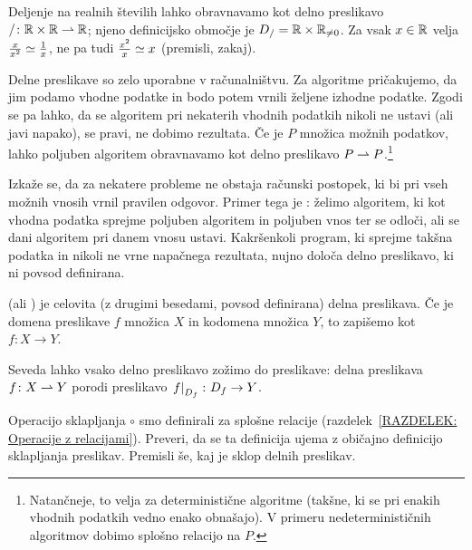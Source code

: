                \begin{zgled}
                        Deljenje na realnih številih lahko obravnavamo kot delno preslikavo $/\colon \mathbb{R} \times \mathbb{R} \mathrel{\rightharpoonup} \mathbb{R}$; njeno definicijsko območje je $D_{/} = \mathbb{R} \times \mathbb{R}_{\neq 0}$. Za vsak $x \in \mathbb{R}$ velja $\frac{x}{x^2} \simeq \frac{1}{x}$, ne pa tudi $\frac{x^2}{x} \simeq x$ (premisli, zakaj).
                \end{zgled}

                \begin{zgled}
                        Delne preslikave so zelo uporabne v računalništvu. Za algoritme pričakujemo, da jim podamo vhodne podatke in bodo potem vrnili željene izhodne podatke. Zgodi se pa lahko, da se algoritem pri nekaterih vhodnih podatkih nikoli ne ustavi (ali javi napako), se pravi, ne dobimo rezultata. Če je $P$ množica možnih podatkov, lahko poljuben algoritem obravnavamo kot delno preslikavo $P \mathrel{\rightharpoonup} P$.\footnote{Natančneje, to velja za deterministične algoritme (takšne, ki se pri enakih vhodnih podatkih vedno enako obnašajo). V primeru nedeterminističnih algoritmov dobimo splošno relacijo na $P$.}

                        Izkaže se, da za nekatere probleme ne obstaja računski postopek, ki bi pri vseh možnih vnosih vrnil pravilen odgovor. Primer tega je : želimo algoritem, ki kot vhodna podatka sprejme poljuben algoritem in poljuben vnos ter se odloči, ali se dani algoritem pri danem vnosu ustavi. Kakršenkoli program, ki sprejme takšna podatka in nikoli ne vrne napačnega rezultata, nujno določa delno preslikavo, ki ni povsod definirana. 
                \end{zgled}

                \begin{definicija}
                         (ali ) je celovita (z drugimi besedami, povsod definirana) delna preslikava. Če je domena preslikave $f$ množica $X$ in kodomena množica $Y$, to zapišemo kot $f\colon X \to Y$.
                \end{definicija}

                Seveda lahko vsako delno preslikavo zožimo do preslikave: delna preslikava $f\colon X \mathrel{\rightharpoonup} Y$ porodi preslikavo $\left.{f}\right|_{D_{f}}\colon D_{f} \to Y$.

                \begin{vaja}
                        Operacijo sklapljanja $\circ$ smo definirali za splošne relacije (razdelek~\ref{RAZDELEK: Operacije z relacijami}). Preveri, da se ta definicija ujema z običajno definicijo sklapljanja preslikav. Premisli še, kaj je sklop delnih preslikav.
                \end{vaja}


